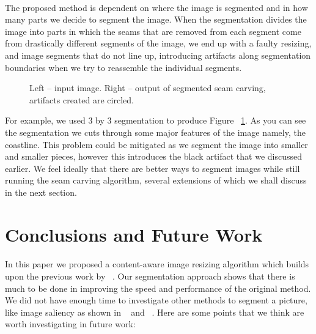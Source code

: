 \documentclass[conference]{acmsiggraph}
\begin{document}
\paragraph{}The proposed method is dependent on where the image is segmented and in how many parts we decide to segment the image. When the segmentation divides the image into parts in which the seams that are removed from each segment come from drastically different segments of the image, we end up with a faulty resizing, and image segments that do not line up, introducing artifacts along segmentation boundaries when we try to reassemble the individual segments. 

\begin{figure}[ht]
    \caption{Left -- input image. Right -- output of segmented seam carving, artifacts created are circled.}
    \label{fig:Beach_in_and_out}
\end{figure}

For example, we used 3 by 3 segmentation to produce Figure ~\ref{fig:Beach_in_and_out}.  As you can see the segmentation we cuts through some major features of the image namely, the coastline.  This problem could be mitigated as we segment the image into smaller and smaller pieces, however this introduces the black artifact that we discussed earlier.  We feel ideally that there are better ways to segment images while still running the seam carving algorithm, several extensions of which we shall discuss in the next section.  


\section{Conclusions and Future Work}

\paragraph{}
In this paper we proposed a content-aware image resizing algorithm which builds upon the previous work by ~\cite{Avidan2007}. Our segmentation approach shows that there is much to be done in improving the speed and performance of the original method. We did not have enough time to investigate other methods to segment a picture, like image saliency as shown in ~\cite{Liu2007} and ~\cite{Hasan2009}. Here are some points that we think are worth investigating in future work:
\end{document}
